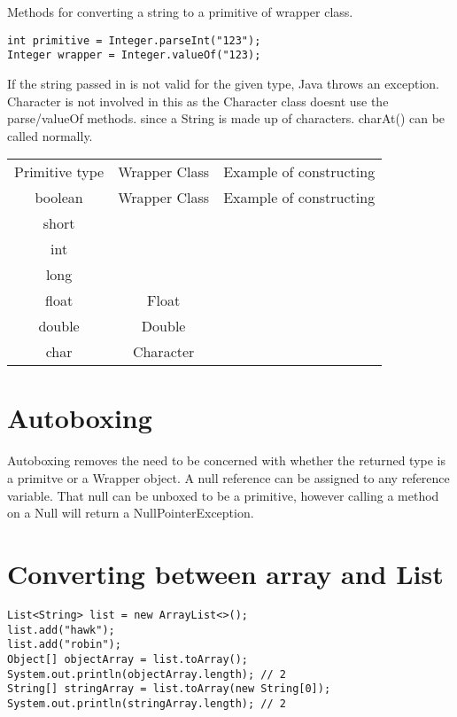 \documentclass[a4paper]{report}   %
\begin{document}
Methods for converting a string to a primitive of wrapper class.

\begin{lstlisting}
int primitive = Integer.parseInt("123");
Integer wrapper = Integer.valueOf("123);
\end{lstlisting}

If the string passed in is not valid for the given type, Java throws an exception. Character is not involved in this as the Character class doesnt use the parse/valueOf methods. since a String is made up of characters. charAt() can be called normally.

\begin{center}
\begin{tabular}{| c | c | c |}
Primitive type & Wrapper Class & Example of constructing\\
boolean & Wrapper Class & Example of constructing\\
short\\
int\\
long\\
float & Float\\
double & Double\\
char & Character\\
\end{tabular}
\end{center}

\section{Autoboxing}

Autoboxing removes the need to be concerned with whether the returned type is a primitve or a Wrapper object. A null reference can be assigned to any reference variable. That null can be unboxed to be a primitive, however calling a method on a Null will return a NullPointerException. 

\section{Converting between array and List}

\begin{lstlisting}
List<String> list = new ArrayList<>();
list.add("hawk");
list.add("robin");
Object[] objectArray = list.toArray();
System.out.println(objectArray.length); // 2
String[] stringArray = list.toArray(new String[0]);
System.out.println(stringArray.length); // 2
\end{lstlisting}
\end{document}
